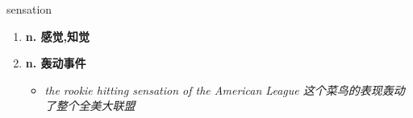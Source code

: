 
\begin{frame}
{\huge sensation}
\begin{center}
\begin{enumerate}\Large
  \item \textbf{n. 感觉,知觉}
  \item \textbf{n. 轰动事件}
  \begin{itemize}
    \item \em{\Large{the rookie hitting sensation of the American League 这个菜鸟的表现轰动了整个全美大联盟}}
  \end{itemize}
\end{enumerate}
\end{center}
\end{frame}
